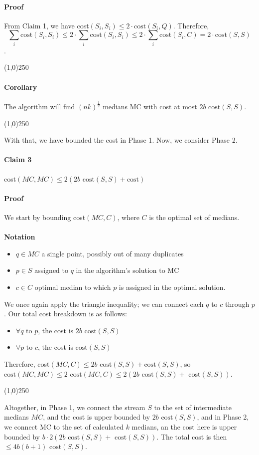 \documentclass[11pt]{article}
\begin{document}
\paragraph{Proof} From Claim 1, we have cost$(S_i, S_i) \le 2 \cdot \text{cost}(S_i,Q)$. Therefore, $$\sum_i \text{cost}(S_i, S_i) \le 2 \cdot \sum_i \text{cost}(S_i, S_i) \le 2 \cdot \sum_i \text{cost}(S_i, C) = 2 \cdot \text{cost}(S,S)$$.
\begin{center}
\line(1,0){250}
\end{center}
\paragraph{Corollary} The algorithm will find $(nk)^{\frac{1}{2}}$ medians MC with cost at most $2b  \text{ cost}(S,S)$.
\begin{center}
\line(1,0){250}
\end{center}
With that, we have bounded the cost in Phase 1. Now, we consider Phase 2.
\paragraph{Claim 3} cost$(MC,MC) \le 2(2b \text{ cost}(S,S) + \text{cost})$
\paragraph{Proof} We start by bounding cost$(MC,C)$, where $C$ is the optimal set of medians.
\\
\\
\textbf{Notation}
\begin{itemize}
\item $q \in MC$ a single point, possibly out of many duplicates
\item $p \in S$ assigned to $q$ in the algorithm's solution to MC
\item $c \in C$ optimal median to which $p$ is assigned in the optimal solution.
\end{itemize}
We once again apply the triangle inequality; we can connect each $q$ to $c$ through $p$. Our total cost breakdown is as follows:
\begin{itemize}
\item $\forall  q \text{ to } p$, the cost is $2b \text{ cost}(S,S)$
\item $\forall  p \text{ to } c$, the cost is $\text{cost}(S,S)$
\end{itemize}
Therefore, cost$(MC,C) \le 2b \text{ cost}(S,S) + \text{cost}(S,S)$, so $\text{cost}(MC,MC) \le 2 \text{ cost}(MC,C) \le 2(2b \text{ cost}(S,S) + \text{ cost}(S,S))$.
\begin{center}
\line(1,0){250}
\end{center}
Altogether, in Phase 1, we connect the stream $S$ to the set of intermediate medians $MC$, and the cost is upper bounded by $2b \text{ cost}(S,S)$, and in Phase 2, we connect MC to the set of calculated $k$ medians, an the cost here is upper bounded by $b \cdot 2(2b \text{ cost}(S,S) + \text{ cost}(S,S))$. The total cost is then $\le \boxed{4b(b+1) \text{ cost}(S,S)}$.
\end{document}
